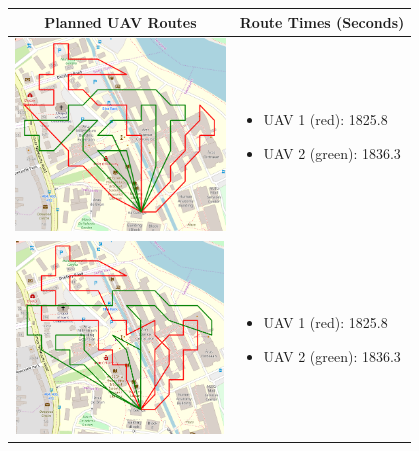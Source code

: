 \begin{table}[h!]
  \centering
  \begin{tabular}{ | c | m{5cm} | }
    \hline
    Planned UAV Routes & Route Times (Seconds) \\
    \hline
    
    \begin{minipage}[c][53mm][c]{.6\textwidth}
      \includegraphics[width=\linewidth, height=51mm]{Chapters/MultiAgentCoverage/MultipleTravellingSalesman/Figs/ORToolsSolns/SpeedOneOne.PNG}

    \end{minipage}
    &
    \begin{itemize}[leftmargin=*]
      \item[] UAV 1 (red): 1825.8
      \item[] UAV 2 (green): 1836.3
    \end{itemize}
    \\
    \hline
    \begin{minipage}[c][53mm][c]{.6\textwidth}
      \includegraphics[width=\linewidth, height=51mm]{Chapters/MultiAgentCoverage/MultipleTravellingSalesman/Figs/ORToolsSolns/SpeedOneOneTimeDemandTwo.PNG}
    \end{minipage}
    &
    \begin{itemize}[leftmargin=*]
        \item[] UAV 1 (red): 1825.8
        \item[] UAV 2 (green): 1836.3
    \end{itemize}
    \\
    \hline
    

\end{tabular}
\end{table}
